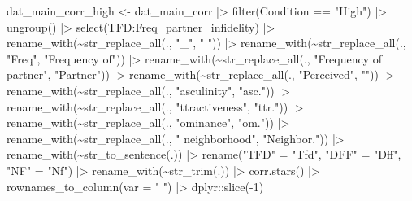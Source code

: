 \documentclass[
  bookmarksnumbered]{article}
\newenvironment{Shaded}{\begin{snugshade}}{\end{snugshade}}
\newcommand{\AttributeTok}[1]{\textcolor[rgb]{0.80,0.80,0.80}{#1}}
\newcommand{\DecValTok}[1]{\textcolor[rgb]{0.86,0.86,0.80}{#1}}
\newcommand{\FunctionTok}[1]{\textcolor[rgb]{0.94,0.94,0.56}{#1}}
\newcommand{\NormalTok}[1]{\textcolor[rgb]{0.80,0.80,0.80}{#1}}
\newcommand{\OtherTok}[1]{\textcolor[rgb]{0.94,0.94,0.56}{#1}}
\newcommand{\SpecialCharTok}[1]{\textcolor[rgb]{0.86,0.64,0.64}{#1}}
\newcommand{\StringTok}[1]{\textcolor[rgb]{0.80,0.58,0.58}{#1}}
\begin{document}
\begin{Shaded}
\begin{Highlighting}[]
\NormalTok{dat\_main\_corr\_high }\OtherTok{\textless{}{-}}\NormalTok{ dat\_main\_corr }\SpecialCharTok{|\textgreater{}} 
  \FunctionTok{filter}\NormalTok{(Condition }\SpecialCharTok{==} \StringTok{"High"}\NormalTok{) }\SpecialCharTok{|\textgreater{}} 
  \FunctionTok{ungroup}\NormalTok{() }\SpecialCharTok{|\textgreater{}} 
  \FunctionTok{select}\NormalTok{(TFD}\SpecialCharTok{:}\NormalTok{Freq\_partner\_infidelity) }\SpecialCharTok{|\textgreater{}} 
  \FunctionTok{rename\_with}\NormalTok{(}\SpecialCharTok{\textasciitilde{}}\FunctionTok{str\_replace\_all}\NormalTok{(., }\StringTok{"\_"}\NormalTok{, }\StringTok{" "}\NormalTok{)) }\SpecialCharTok{|\textgreater{}} 
  \FunctionTok{rename\_with}\NormalTok{(}\SpecialCharTok{\textasciitilde{}}\FunctionTok{str\_replace\_all}\NormalTok{(., }\StringTok{"Freq"}\NormalTok{, }\StringTok{"Frequency of"}\NormalTok{)) }\SpecialCharTok{|\textgreater{}}
  \FunctionTok{rename\_with}\NormalTok{(}\SpecialCharTok{\textasciitilde{}}\FunctionTok{str\_replace\_all}\NormalTok{(., }\StringTok{"Frequency of partner"}\NormalTok{, }\StringTok{"Partner"}\NormalTok{)) }\SpecialCharTok{|\textgreater{}}
  \FunctionTok{rename\_with}\NormalTok{(}\SpecialCharTok{\textasciitilde{}}\FunctionTok{str\_replace\_all}\NormalTok{(., }\StringTok{"Perceived"}\NormalTok{, }\StringTok{""}\NormalTok{)) }\SpecialCharTok{|\textgreater{}}
  \FunctionTok{rename\_with}\NormalTok{(}\SpecialCharTok{\textasciitilde{}}\FunctionTok{str\_replace\_all}\NormalTok{(., }\StringTok{"asculinity"}\NormalTok{, }\StringTok{"asc."}\NormalTok{)) }\SpecialCharTok{|\textgreater{}}
  \FunctionTok{rename\_with}\NormalTok{(}\SpecialCharTok{\textasciitilde{}}\FunctionTok{str\_replace\_all}\NormalTok{(., }\StringTok{"ttractiveness"}\NormalTok{, }\StringTok{"ttr."}\NormalTok{)) }\SpecialCharTok{|\textgreater{}}
  \FunctionTok{rename\_with}\NormalTok{(}\SpecialCharTok{\textasciitilde{}}\FunctionTok{str\_replace\_all}\NormalTok{(., }\StringTok{"ominance"}\NormalTok{, }\StringTok{"om."}\NormalTok{)) }\SpecialCharTok{|\textgreater{}}
  \FunctionTok{rename\_with}\NormalTok{(}\SpecialCharTok{\textasciitilde{}}\FunctionTok{str\_replace\_all}\NormalTok{(., }\StringTok{" neighborhood"}\NormalTok{, }\StringTok{"Neighbor."}\NormalTok{)) }\SpecialCharTok{|\textgreater{}}
  \FunctionTok{rename\_with}\NormalTok{(}\SpecialCharTok{\textasciitilde{}}\FunctionTok{str\_to\_sentence}\NormalTok{(.)) }\SpecialCharTok{|\textgreater{}}
    \FunctionTok{rename}\NormalTok{(}\StringTok{"TFD"} \OtherTok{=} \StringTok{"Tfd"}\NormalTok{, }
         \StringTok{"DFF"} \OtherTok{=} \StringTok{"Dff"}\NormalTok{, }
         \StringTok{"NF"} \OtherTok{=} \StringTok{"Nf"}\NormalTok{) }\SpecialCharTok{|\textgreater{}} 
  \FunctionTok{rename\_with}\NormalTok{(}\SpecialCharTok{\textasciitilde{}}\FunctionTok{str\_trim}\NormalTok{(.)) }\SpecialCharTok{|\textgreater{}}
  \FunctionTok{corr.stars}\NormalTok{() }\SpecialCharTok{|\textgreater{}}
  \FunctionTok{rownames\_to\_column}\NormalTok{(}\AttributeTok{var =} \StringTok{" "}\NormalTok{) }\SpecialCharTok{|\textgreater{}} 
\NormalTok{  dplyr}\SpecialCharTok{::}\FunctionTok{slice}\NormalTok{(}\SpecialCharTok{{-}}\DecValTok{1}\NormalTok{)}
  

\end{Highlighting}
\end{Shaded}
\end{document}
